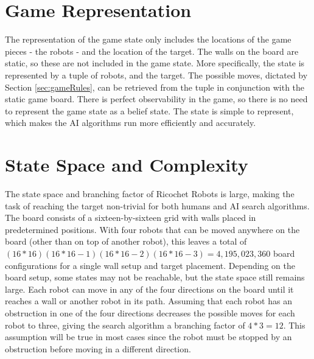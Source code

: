 \documentclass[a4paper,10pt]{article}
\begin{document}


\section{Game Representation}
\label{sec:gameRep}
The representation of the game state only includes the locations of the game pieces - the robots - and the location of the target. The walls on the board are static,
so these are not included in the game state. More specifically, the state is represented by a tuple of robots, and the target. The possible moves, dictated by Section
\ref{sec:gameRules}, can be retrieved from the tuple in conjunction with the static game board. There is perfect observability in the game, so there is no need to represent the game state as a belief state. The state is simple to represent, which makes the AI algorithms run more efficiently and accurately.


\section{State Space and Complexity}
\label{sec:stateSpace}
The state space and branching factor of Ricochet Robots is large, making the task of reaching the target non-trivial for both humans and AI search algorithms.
The board consists of a sixteen-by-sixteen grid with walls placed in predetermined positions.  With four robots that can be moved anywhere on the board (other
than on top of another robot), this leaves a total of $(16*16)(16*16-1)(16*16-2)(16*16-3) = 4,195,023,360$ board configurations for a single wall setup and
target placement.  Depending on the board setup, some states may not be reachable, but the state space still remains large. Each robot can move in any of the
four directions on the board until it reaches a wall or another robot in its path.  Assuming that each robot has an obstruction in one of the four directions
decreases the possible moves for each robot to three, giving the search algorithm a branching factor of $4*3 = 12$.  This assumption will be true in most cases since
the robot must be stopped by an obstruction before moving in a different direction. \\
\end{document}
